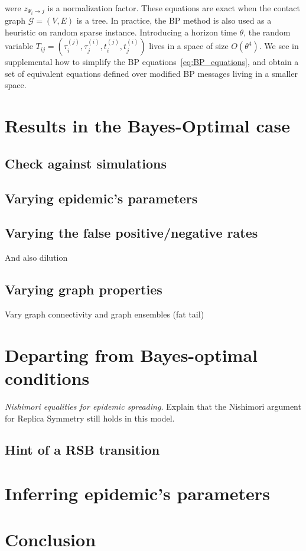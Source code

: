 \documentclass[a4paper, amsfonts, amssymb, amsmath, reprint, showkeys, nofootinbib, twoside, floatfix, pre,superscriptaddress]{revtex4-2}
\begin{document}
were $z_{\Psi_i\to j}$ is a normalization factor. 
These equations are exact when the contact graph $\mathcal{G}=(V,E)$ is a tree. In practice, the BP method is also used as a heuristic on random sparse instance.
Introducing a horizon time $\theta$, the random variable $T_{ij}=(\tau_i^{(j)},\tau_j^{(i)}, t_i^{(j)},t_j^{(i)})$ lives in a space of size $O(\theta^4)$.
We see in supplemental how to simplify the BP equations~\ref{eq:BP_equations}, and obtain a set of equivalent equations defined over modified BP messages living in a smaller space.


\section{Results in the Bayes-Optimal case}
\subsection{Check against simulations}
\subsection{Varying epidemic's parameters}
\subsection{Varying the false positive/negative rates}
And also dilution
\subsection{Varying graph properties}
Vary graph connectivity and graph ensembles (fat tail)
\section{Departing from Bayes-optimal conditions}
{\em Nishimori equalities for epidemic spreading.}
Explain that the Nishimori argument for Replica Symmetry still holds in this model.
\subsection{Hint of a RSB transition}
\section{Inferring epidemic's parameters}

\section{Conclusion}





\end{document}
